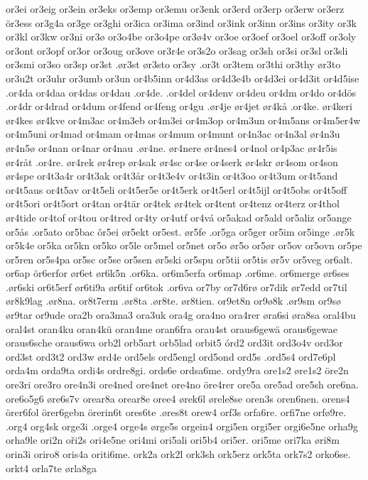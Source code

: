 {{or3ei
or3eig
or3ein
ør3eks
or3emp
or3emu
or3enk
or3erd
or3erp
or3erw
or3erz
ör3ess
or3g4a
or3ge
or3ghi
or3ica
or3ima
or3ind
or3ink
or3inn
or3ins
or3ity
or3k
or3kl
or3kw
or3ni
or3ø
or3o4be
or3o4pe
or3ø4v
or3oe
or3oef
or3oel
or3off
or3oly
or3ont
or3opf
or3or
or3oug
or3ove
or3r4e
or3s2o
or3sag
or3sh
or3si
or3sl
or3sli
or3smi
or3so
or3sp
or3st
.ør3st
ør3sto
or3sy
.or3t
or3tem
or3thi
or3thy
ør3to
or3u2t
or3uhr
or3umb
or3un
or4b5inn
or4d3as
or4d3e4b
or4d3ei
or4d3it
or4d5ise
.or4da
or4daa
or4das
or4dau
.or4de.
.or4del
or4denv
or4deu
or4dm
or4do
or4dös
.or4dr
or4drad
or4dum
or4fend
or4feng
or4gu
.ør4je
ør4jet
ør4kå
.or4ke.
ør4keri
ør4kes
ør4kve
or4m3ac
or4m3eb
or4m3ei
or4m3op
or4m3un
or4m5ans
or4m5er4w
or4m5uni
or4mad
or4mam
or4mas
or4mum
or4munt
or4n3ac
or4n3al
ør4n3u
ør4n5ø
or4nan
or4nar
or4nau
.ør4ne.
ør4nere
ør4nes4
or4nol
or4p3ac
ør4r5is
ør4råt
.or4re.
ør4rek
ør4rep
ør4sak
ør4sc
or4se
or4serk
ør4skr
ør4som
or4son
ør4spe
or4t3a4r
or4t3ak
or4t3år
or4t3e4v
or4t3in
or4t3oo
or4t3um
or4t5and
or4t5aus
or4t5av
or4t5eli
or4t5er5e
or4t5erk
or4t5erl
or4t5ijl
or4t5obs
or4t5off
or4t5ori
or4t5ort
or4tan
or4tär
or4tek
ør4tek
or4tent
or4tenz
or4terz
or4thol
ør4tide
or4tof
or4tou
or4tred
or4ty
or4utf
or4vá
or5akad
or5ald
or5aliz
or5ange
or5ås
.or5ato
or5bac
ôr5ei
ør5ekt
or5est.
ør5fe
.or5ga
or5ger
or5im
or5inge
.ør5k
or5k4e
or5ka
or5kn
or5ko
or5le
or5mel
or5net
or5o
ør5o
or5ør
or5ov
or5ovn
or5pe
or5ren
or5s4pa
or5sc
or5se
or5sen
ør5ski
or5spu
or5tii
or5tis
ør5v
or5veg
or6alt.
or6ap
ör6erfor
ør6et
ør6k5n
.or6ka.
or6m5erfa
or6map
.or6me.
or6merge
ør6ses
.ør6ski
or6t5erf
ør6ti9a
ør6tif
or6tok
.or6va
or7by
or7d6rø
or7dik
ør7edd
or7til
ør8k9lag
.ør8na.
or8t7erm
.ør8ta
.ør8te.
ør8tien.
or9et8n
or9ø8k
.ør9sm
or9sø
ør9tar
or9ude
ora2b
ora3ma3
ora3uk
ora4g
ora4no
ora4rer
øra6si
øra8sa
oral4bu
oral4st
oran4ku
oran4kü
oran4me
oran6fra
orau4st
oraus6gewä
oraus6gewae
oraus6sche
oraus6wa
orb2l
orb5art
orb5lad
orbit5
órd2
ord3it
ord3o4v
ord3or
ord3st
ord3t2
ord3w
ørd4e
ord5els
ord5engl
ord5ond
ord5s
.ord5s4
ord7e6pl
orda4m
orda9ta
ordi4s
ordre8gi.
ords6e
ordsa6me.
ordy9ra
ore1s2
øre1s2
öre2n
ore3ri
ore3ro
ore4n3i
ore4ned
ore4net
ore4no
öre4rer
ore5a
ore5ad
ore5sh
ore6na.
ore6o5g6
øre6s7v
orear8a
orear8e
oree4
ørek6l
ørele8se
oren3s
oren6nen.
orens4
örer6fol
örer6gebn
örerin6t
ores6te
.øres8t
orew4
orf3s
orfa6re.
orfi7ne
orfø9re.
.org4
org4sk
orge3i
.orge4
orge4s
ørge5s
orgein4
orgi5en
orgi5er
orgi6e5ne
orha9g
orha9le
ori2n
oři2s
ori4e5ne
ori4mi
ori5ali
ori5b4
ori5er.
ori5me
ori7ka
øri8m
orin3i
oriro8
oris4a
oriti6me.
ork2a
ork2l
ork3sh
ork5erz
ork5ta
ork7s2
orko6se.
orkt4
orla7te
ørla8ga
}}
